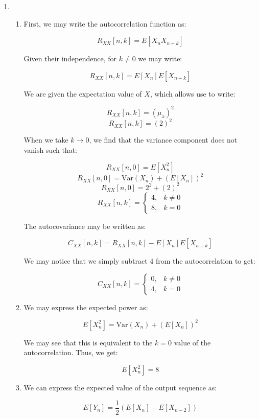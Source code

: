 \begin{enumerate}

  \item

    \begin{enumerate}

      \item First, we may write the autocorrelation function as:

        $$R_{XX}[n,k]=E[X_nX_{n+k}]$$

        Given their independence, for $k\neq 0$ we may write:

        $$R_{XX}[n,k]=E[X_n]E[X_{n+k}]$$

        We are given the expectation value of $X$, which allows use to write:

        $$R_{XX}[n,k]=(\mu_x)^2$$
        $$R_{XX}[n,k]=(2)^2$$

        When we take $k\to0$, we find that the variance component does not vanish such that:

        $$R_{XX}[n,0]=E[X_n^2]$$
        $$R_{XX}[n,0]=\text{Var}(X_n)+(E[X_n])^2$$
        $$R_{XX}[n,0]=2^2+(2)^2$$
        $$\boxed{R_{XX}[n,k]=\left\{\begin{array}{ll} 4, & k\neq0\\8, & k=0\end{array}}$$

        The autocovariance may be written as:

        $$C_{XX}[n,k]=R_{XX}[n,k]-E[X_n]E[X_{n+k}]$$

        We may notice that we simply subtract 4 from the autocorrelation to get:

        $$\boxed{C_{XX}[n,k]=\left\{\begin{array}{ll} 0, & k\neq0\\4, & k=0\end{array}}$$

      \item We may express the expected power as:

        $$E[X_n^2]=\text{Var}(X_n)+(E[X_n])^2$$

        We may see that this is equivalent to the $k=0$ value of the autocorrelation. Thus, we get:

        $$\boxed{E[X_n^2]=8}$$

      \item We can express the expected value of the output sequence as:

        $$E[Y_n]=\frac{1}{2}(E[X_n]-E[X_{n-2}])$$


\end{enumerate}
\end{enumerate}

